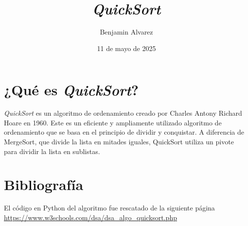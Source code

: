 \documentclass{article}
\title{\textit{QuickSort}}
\date{11 de mayo de 2025}
\author{Benjamin Alvarez}
\begin{document}
\maketitle

\section*{¿Qué es \textit{QuickSort}?}
\textit{QuickSort} es un algoritmo de ordenamiento  creado por Charles Antony Richard Hoare en 1960. Este es un eficiente y ampliamente utilizado algoritmo de ordenamiento que se basa en el principio de dividir y conquistar. A diferencia de MergeSort, que divide la lista en mitades iguales, QuickSort utiliza un pivote para dividir la lista en sublistas.
\section*{Bibliografía}
El código en Python del algoritmo fue rescatado de la siguiente página \\
\url{https://www.w3schools.com/dsa/dsa_algo_quicksort.php}
\end{document}

